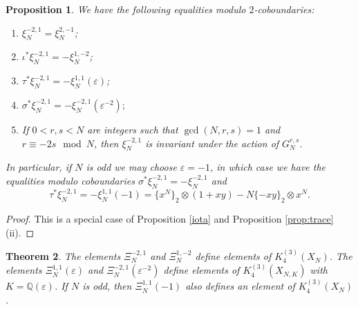 \documentclass[11pt,a4,leqno]{amsart}
\theoremstyle{my theoremstyle}
\newtheorem{thm}{Theorem}[section]
\newtheorem{prop}[thm]{Proposition}
\theoremstyle{dfn}
\theoremstyle{remark}
\renewcommand{\1}{\mathbbm{1}}
\newcommand{\Q}{\mathbb{Q}}
\newcommand{\e}{\varepsilon}
\numberwithin{equation}{section}
\begin{document}
\begin{prop}\label{cor:pb}
We have the following equalities modulo $2$-coboundaries: 
\begin{enumerate}
\item  $\xi^{-2, 1}_N=\xi^{2, -1}_N$;
\item $\iota^* \xi^{-2, 1}_N=-  \xi^{1, -2}_N$;
\item $\tau^* \xi^{-2, 1}_N=-\xi^{1, 1}_N(\e)$;
\item $\sigma^* \xi^{-2, 1}_N =-\xi^{-2, 1}_N(\e^{-2});$
\item If $0< r,s<N$ are integers such that $\gcd(N,r,s)=1$ and $r\equiv -2s \mod N$, then $\xi^{-2, 1}_N$ is invariant under the action of $G_N^{r,s}$. 
\end{enumerate}
In particular, if $N$ is odd we may choose $\varepsilon=-1$, in which case we have the equalities modulo coboundaries $\sigma^* \xi^{-2, 1}_N =-\xi^{-2, 1}_N$ and
\[ 
\tau^* \xi^{-2, 1}_N=- \xi^{1, 1}_N(-1)=\{x^N\}_2 \otimes (1 + x y) - N \{ - x y \}_2 \otimes x^N. 
\]
\end{prop}

\begin{proof}
    This is a special case of Proposition \ref{iota} and Proposition \ref{prop:trace}(ii).
\end{proof}

\begin{thm}\label{prop:res1}
The elements $\Xi_N^{-2, 1}$ and $\Xi_N^{1, -2}$ define elements of $K_4^{(3)}(X_N)$. The elements $\Xi_N^{1, 1}(\e)$ and $\Xi_N^{-2, 1}(\e^{-2})$ define elements of $K_4^{(3)}(X_{N,K})$ with $K=\Q(\e)$.
If $N$ is odd, then $\Xi_N^{1,1}(-1)$ also defines an element of $K_4^{(3)}(X_N)$. 
\end{thm}
\end{document}
